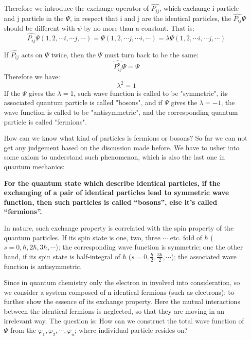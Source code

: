 Therefore we introduce the exchange operator of $\hat{P_{ij}}$,
which exchange i particle and j particle in the $\Psi$, in respect
that i and j are the identical particles, the $\hat{P_{ij}}\Psi$
should be different with $\psi$ by no more than a constant. That is:
\begin{equation}\label{IDENTICALeq:1}
\hat{P_{ij}}\Psi(1, 2, \cdots i, \cdots j, \cdots ) = \Psi(1, 2,
\cdots j, \cdots i, \cdots ) = \lambda\Psi(1, 2, \cdots i, \cdots j,
\cdots )
\end{equation}

If $\hat{P_{ij}}$ acts on $\Psi$ twice, then the $\Psi$ must turn
back to be the same:
\begin{equation}\label{IDENTICALeq:2}
\hat{P^{2}_{ij}}\Psi = \Psi
\end{equation}
Therefore we have:
\begin{equation}\label{IDENTICALeq:3}
\lambda^{2} = 1
\end{equation}
If the $\Psi$ gives the $\lambda=1$, such wave function is called to
be "symmetric", its associated quantum particle is called "bosons",
and if $\Psi$ gives the $\lambda=-1$, the wave function is called to
be "antisymmetric", and the corresponding quantum particle is called
"fermions".

How can we know what kind of particles is fermions or bosons? So far
we can not get any judgement based on the discussion made before. We
have to usher into some axiom to understand such phenomenon, which
is also the last one in quantum mechanics:
\begin{axiom}\label{axiom7}
\textbf{For the quantum state which describe identical particles, if
the exchanging of a pair of identical particles lead to symmetric
wave function, then such particles is called ``bosons'', else it's
called ``fermions''. }
\end{axiom}

In nature, such exchange property is correlated with the spin
property of the quantum particles. If its spin state is one, two,
three $\cdots$ etc. fold of $\hbar$ ($s=0, \hbar, 2\hbar, 3\hbar,
\cdots$); the corresponding wave function is symmetric; one the
other hand, if its spin state is half-integral of $\hbar$ ($s=0,
\frac{\hbar}{2}, \frac{3\hbar}{2}, \cdots$); the associated wave
function is antisymmetric.

Since in quantum chemistry only the electron in involved into
consideration, so we consider a system composed of n identical
fermions (such as electrons); to further show the essence of its
exchange property. Here the mutual interactions between the
identical fermions is neglected, so that they are moving in an
irrelevant way. The question is: How can we construct the total wave
function of $\Psi$ from the $\varphi_{1}, \varphi_{2}, \cdots,
\varphi_{n}$; where individual particle resides on?


